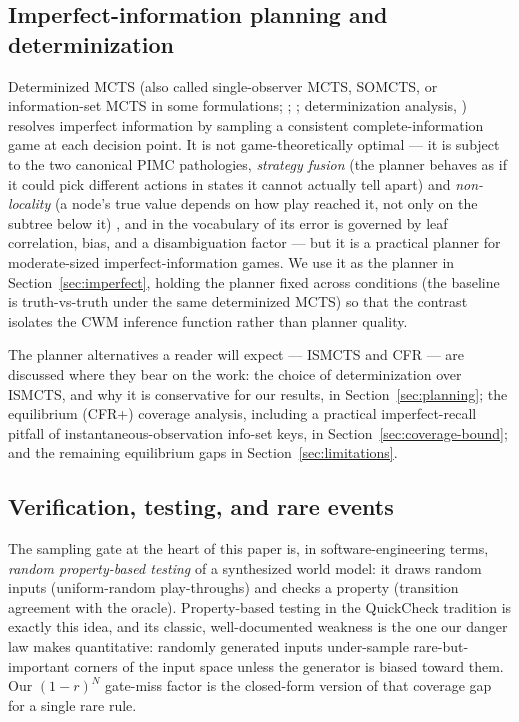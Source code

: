 \documentclass[11pt]{article}
\theoremstyle{remark}
\begin{document}
\subsection{Imperfect-information planning and determinization}

Determinized MCTS (also called single-observer MCTS, SOMCTS, or information-set MCTS in some formulations; \citealp{cowling2012ismcts}; \citealp{whitehouse2011determinization}; determinization analysis, \citealp{long2010pimc}) resolves imperfect information by sampling a consistent complete-information game at each decision point. It is not game-theoretically optimal --- it is subject to the two canonical PIMC pathologies, \emph{strategy fusion} (the planner behaves as if it could pick different actions in states it cannot actually tell apart) and \emph{non-locality} (a node's true value depends on how play reached it, not only on the subtree below it) \citep{frank1998incomplete}, and in the vocabulary of \citet{long2010pimc} its error is governed by leaf correlation, bias, and a disambiguation factor --- but it is a practical planner for moderate-sized imperfect-information games. We use it as the planner in Section~\ref{sec:imperfect}, holding the planner fixed across conditions (the baseline is truth-vs-truth under the same determinized MCTS) so that the contrast isolates the CWM inference function rather than planner quality.

The planner alternatives a reader will expect --- ISMCTS \citep{cowling2012ismcts} and CFR \citep{zinkevich2007cfr,lanctot2009mccfr,tammelin2014cfrplus} --- are discussed where they bear on the work: the choice of determinization over ISMCTS, and why it is conservative for our results, in Section~\ref{sec:planning}; the equilibrium (CFR+) coverage analysis, including a practical imperfect-recall pitfall of instantaneous-observation info-set keys, in Section~\ref{sec:coverage-bound}; and the remaining equilibrium gaps in Section~\ref{sec:limitations}.

\subsection{Verification, testing, and rare events}

The sampling gate at the heart of this paper is, in software-engineering terms, \emph{random property-based testing} of a synthesized world model: it draws random inputs (uniform-random play-throughs) and checks a property (transition agreement with the oracle). Property-based testing in the QuickCheck tradition \citep{claessen2000quickcheck} is exactly this idea, and its classic, well-documented weakness is the one our danger law makes quantitative: randomly generated inputs under-sample rare-but-important corners of the input space unless the generator is biased toward them. Our $(1-r)^N$ gate-miss factor is the closed-form version of that coverage gap for a single rare rule.
\end{document}
